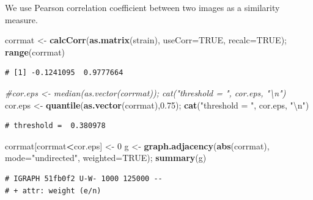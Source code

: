 \documentclass[]{article}
\newenvironment{Shaded}{\begin{snugshade}}{\end{snugshade}}
\newcommand{\KeywordTok}[1]{\textcolor[rgb]{0.13,0.29,0.53}{\textbf{#1}}}
\newcommand{\DataTypeTok}[1]{\textcolor[rgb]{0.13,0.29,0.53}{#1}}
\newcommand{\DecValTok}[1]{\textcolor[rgb]{0.00,0.00,0.81}{#1}}
\newcommand{\FloatTok}[1]{\textcolor[rgb]{0.00,0.00,0.81}{#1}}
\newcommand{\CharTok}[1]{\textcolor[rgb]{0.31,0.60,0.02}{#1}}
\newcommand{\StringTok}[1]{\textcolor[rgb]{0.31,0.60,0.02}{#1}}
\newcommand{\CommentTok}[1]{\textcolor[rgb]{0.56,0.35,0.01}{\textit{#1}}}
\newcommand{\OtherTok}[1]{\textcolor[rgb]{0.56,0.35,0.01}{#1}}
\newcommand{\OperatorTok}[1]{\textcolor[rgb]{0.81,0.36,0.00}{\textbf{#1}}}
\newcommand{\NormalTok}[1]{#1}
\begin{document}
We use Pearson correlation coefficient between two images as a
similarity measure.

\begin{Shaded}
\begin{Highlighting}[]
\NormalTok{corrmat <-}\StringTok{ }\KeywordTok{calcCorr}\NormalTok{(}\KeywordTok{as.matrix}\NormalTok{(strain), }\DataTypeTok{useCorr=}\OtherTok{TRUE}\NormalTok{, }\DataTypeTok{recalc=}\OtherTok{TRUE}\NormalTok{); }\KeywordTok{range}\NormalTok{(corrmat)}
\end{Highlighting}
\end{Shaded}

\begin{verbatim}
# [1] -0.1241095  0.9777664
\end{verbatim}

\begin{Shaded}
\begin{Highlighting}[]
\CommentTok{#cor.eps <- median(as.vector(corrmat)); cat("threshold = ", cor.eps, "\textbackslash{}n")}
\NormalTok{cor.eps <-}\StringTok{ }\KeywordTok{quantile}\NormalTok{(}\KeywordTok{as.vector}\NormalTok{(corrmat),}\FloatTok{0.75}\NormalTok{); }\KeywordTok{cat}\NormalTok{(}\StringTok{"threshold = "}\NormalTok{, cor.eps, }\StringTok{"}\CharTok{\textbackslash{}n}\StringTok{"}\NormalTok{)}
\end{Highlighting}
\end{Shaded}

\begin{verbatim}
# threshold =  0.380978
\end{verbatim}

\begin{Shaded}
\begin{Highlighting}[]
\NormalTok{corrmat[corrmat}\OperatorTok{<}\NormalTok{cor.eps] <-}\StringTok{ }\DecValTok{0}
\NormalTok{g <-}\StringTok{ }\KeywordTok{graph.adjacency}\NormalTok{(}\KeywordTok{abs}\NormalTok{(corrmat), }\DataTypeTok{mode=}\StringTok{"undirected"}\NormalTok{, }\DataTypeTok{weighted=}\OtherTok{TRUE}\NormalTok{); }\KeywordTok{summary}\NormalTok{(g)}
\end{Highlighting}
\end{Shaded}

\begin{verbatim}
# IGRAPH 51fb0f2 U-W- 1000 125000 -- 
# + attr: weight (e/n)
\end{verbatim}
\end{document}

